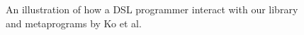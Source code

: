 \documentclass[sigplan,review,fleqn]{acmart}
\renewcommand{\verb}{\collectverb{\color{AgdaFunction}}}
\newcommand{\con}{\collectverb{\color{AgdaInductiveConstructor}}}
\begin{document}
\begin{figure}
	\centering
	\caption{An illustration of how a DSL programmer interact with our library and metaprograms by Ko et al.}
	\label{fig:flow}
\end{figure}

%
\end{document}
